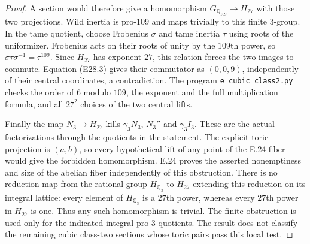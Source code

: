 \begin{proof}
A section would therefore give a homomorphism
$G_{\mathbb Q_{109}}\to H_{27}$ with those two projections.
Wild inertia is pro-$109$ and maps trivially to this finite
$3$-group. In the tame quotient, choose Frobenius $\sigma$
and tame inertia $\tau$ using roots of the uniformizer.
Frobenius acts on their roots of unity by the $109$th power,
so
$\sigma\tau\sigma^{-1}=\tau^{109}$.
Since $H_{27}$ has exponent $27$, this relation forces the
two images to commute. Equation (E28.3) gives their commutator
as $(0,0,9)$, independently of their central coordinates,
a contradiction.
The program \texttt{e\_cubic\_class2.py} checks the order of
$6$ modulo $109$, the exponent and the full multiplication
formula, and all $27^2$ choices of the two central lifts.

Finally the map $N_3\to H_{27}$ kills $\gamma_3N_3$,
$N_3''$ and $\gamma_3 I_3$.
These are the actual factorizations through the quotients in
the statement. The explicit toric projection is $(a,b)$, so
every hypothetical lift of any point of the E.24 fiber would
give the forbidden homomorphism. E.24 proves the asserted
nonemptiness and size of the abelian fiber independently of
this obstruction. There is no reduction map from the rational
group $H_{\mathbb Q_3}$ to $H_{27}$ extending this reduction on
its integral lattice: every element of $H_{\mathbb Q_3}$ is a
$27$th power, whereas every $27$th power in $H_{27}$ is one.
Thus any such homomorphism is trivial.
The finite obstruction is used only for the indicated integral
pro-$3$ quotients. The result does not classify the remaining
cubic class-two sections whose toric pairs pass this local test.
\end{proof}
